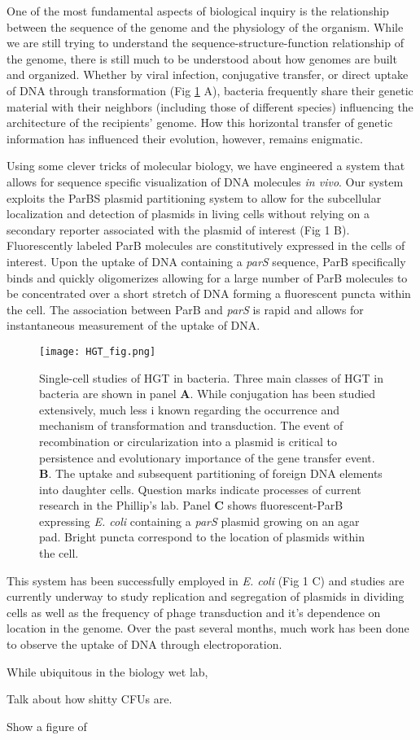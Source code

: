 \documentclass[letterpaper]{article}
\begin{document}
One of the most fundamental aspects of biological inquiry is the relationship
between the sequence of the genome and the physiology of the organism. While we
are still trying to understand the sequence-structure-function relationship of
the genome, there is still much to be understood about how genomes are built and
organized. Whether by viral infection, conjugative transfer, or direct uptake of DNA
through transformation (Fig \ref{fig:hgt_overview} A), bacteria frequently share their genetic material with
their neighbors (including those of different species) influencing the
architecture of the recipients' genome. How this horizontal transfer
of genetic information has influenced their evolution, however, remains enigmatic.

Using some
clever tricks of molecular biology, we have engineered a system that allows for
sequence specific visualization of DNA molecules \textit{in vivo}. Our system
exploits the ParBS plasmid partitioning system to allow for the subcellular
localization and detection of plasmids in living cells without relying on a
secondary reporter associated with the plasmid of interest (Fig 1 B).
Fluorescently labeled ParB molecules are constitutively expressed in the cells
of interest. Upon the uptake of DNA containing a \textit{parS} sequence, ParB
specifically binds and quickly oligomerizes allowing for a large number of ParB
molecules to be concentrated over a short stretch of DNA forming a fluorescent
puncta within the cell. The association
between ParB and \textit{parS} is rapid  and allows for instantaneous
measurement of the uptake of DNA.

\begin{figure}
	\centerline{
		\texttt{[image: HGT\_fig.png]}}
	\caption{\small Single-cell studies of HGT in bacteria. Three main
		classes of HGT in bacteria are shown in panel \textbf{A}. While
	conjugation has been studied extensively, much less i known regarding
the occurrence and mechanism of transformation and transduction. The event of
recombination or circularization into a plasmid is critical to persistence and
evolutionary importance of the gene transfer event. \textbf{B}. The uptake and
subsequent partitioning of foreign DNA elements into daughter cells. Question
marks indicate processes of current research in the Phillip's lab. Panel
\textbf{C} shows fluorescent-ParB expressing \textit{E. coli} containing a
\textit{parS} plasmid growing on an agar pad. Bright puncta correspond to the
location of plasmids within the cell.} 
\label{fig:hgt_overview}
\end{figure}


This system has been successfully employed in \textit{E. coli} (Fig 1 C) and studies
are currently underway to study replication and segregation of plasmids in
dividing cells as well as the frequency of phage transduction and it's
dependence on location in the genome. Over the past several months, much work
has been done to observe the uptake of DNA through electroporation. 


While ubiquitous in the biology wet lab, 

Talk about how shitty CFUs are.



Show a figure of 
\end{document}

